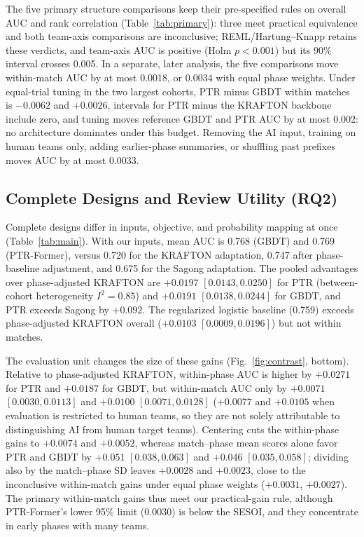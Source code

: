 \documentclass[sigconf,anonymous,nonacm]{acmart}
\begin{document}

The five primary structure comparisons keep their pre-specified rules on overall AUC and rank correlation (Table~\ref{tab:primary}): three meet practical equivalence and both team-axis comparisons are inconclusive; REML/Hartung--Knapp retains these verdicts, and team-axis AUC is positive (Holm $p<0.001$) but its 90\% interval crosses 0.005. In a separate, later analysis, the five comparisons move within-match AUC by at most 0.0018, or 0.0034 with equal phase weights. Under equal-trial tuning in the two largest cohorts, PTR minus GBDT within matches is $-0.0062$ and $+0.0026$, intervals for PTR minus the KRAFTON backbone include zero, and tuning moves reference GBDT and PTR AUC by at most 0.002: no architecture dominates under this budget. Removing the AI input, training on human teams only, adding earlier-phase summaries, or shuffling past prefixes moves AUC by at most 0.0033.

\subsection{Complete Designs and Review Utility (RQ2)}
\label{sec:results:designs}

Complete designs differ in inputs, objective, and probability mapping at once (Table~\ref{tab:main}). With our inputs, mean AUC is 0.768 (GBDT) and 0.769 (PTR-Former), versus 0.720 for the KRAFTON adaptation, 0.747 after phase-baseline adjustment, and 0.675 for the Sagong adaptation. The pooled advantages over phase-adjusted KRAFTON are $+0.0197$ $[0.0143,\allowbreak 0.0250]$ for PTR (between-cohort heterogeneity $I^2=0.85$) and $+0.0191$ $[0.0138,\allowbreak 0.0244]$ for GBDT, and PTR exceeds Sagong by $+0.092$. The regularized logistic baseline (0.759) exceeds phase-adjusted KRAFTON overall ($+0.0103$ $[0.0009,\allowbreak 0.0196]$) but not within matches.

The evaluation unit changes the size of these gains (Fig.~\ref{fig:contrast}, bottom). Relative to phase-adjusted KRAFTON, within-phase AUC is higher by $+0.0271$ for PTR and $+0.0187$ for GBDT, but within-match AUC only by $+0.0071$ $[0.0030,\allowbreak 0.0113]$ and $+0.0100$ $[0.0071,\allowbreak 0.0128]$ ($+0.0077$ and $+0.0105$ when evaluation is restricted to human teams, so they are not solely attributable to distinguishing AI from human target teams). Centering cuts the within-phase gains to $+0.0074$ and $+0.0052$, whereas match--phase mean scores alone favor PTR and GBDT by $+0.051$ $[0.038,\allowbreak 0.063]$ and $+0.046$ $[0.035,\allowbreak 0.058]$; dividing also by the match--phase SD leaves $+0.0028$ and $+0.0023$, close to the inconclusive within-match gains under equal phase weights ($+0.0031$, $+0.0027$). The primary within-match gains thus meet our practical-gain rule, although PTR-Former's lower 95\% limit (0.0030) is below the SESOI, and they concentrate in early phases with many teams.
\end{document}

